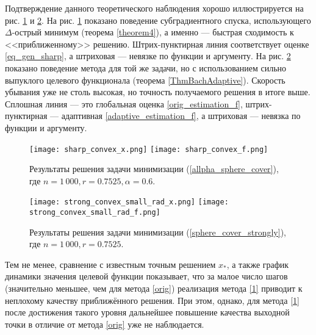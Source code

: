     Подтверждение данного теоретического наблюдения хорошо иллюстрируется на рис. \ref{res_sharp_convex} и \ref{res_strong_convex}. На рис. \ref{res_sharp_convex} показано поведение субградиентного спуска, использующего $\Delta$-острый минимум (теорема \ref{theorem4}), а именно --- быстрая сходимость к <<приближенному>> решению. Штрих-пунктирная линия соответствует оценке \eqref{eq_gen_sharp}, а штриховая --- невязке по функции и аргументу. На рис. \ref{res_strong_convex} показано поведение метода для той же задачи, но с использованием сильно выпуклого целевого функционала (теорема \ref{ThmBachAdaptive}). Скорость убывания уже не столь высокая, но точность получаемого решения в итоге выше. Сплошная линия --- это глобальная оценка \eqref{orig_estimation_f}, штрих-пунктирная --- адаптивная \eqref{adaptive_estimation_f}, а штриховая --- невязка по функции и аргументу.

    \begin{figure}[h]
        \texttt{[image: sharp\_convex\_x.png]}
        \endminipage\hfill
        \texttt{[image: sharp\_convex\_f.png]}
        \endminipage\hfill
        \caption{ Результаты решения задачи минимизации (\ref{allpha_sphere_cover}), где  $n= 1\,000, r = 0.7525, \alpha = 0.6$.}
        \label{res_sharp_convex}
    \end{figure}

    \begin{figure}[h]
        \texttt{[image: strong\_convex\_small\_rad\_x.png]}
        \endminipage\hfill
        \texttt{[image: strong\_convex\_small\_rad\_f.png]}
        \endminipage\hfill
        \caption{ Результаты решения задачи минимизации (\ref{sphere_cover_strongly}), где  $n= 1\,000, r = 0.7525$.}
        \label{res_strong_convex}
    \end{figure}

    Тем не менее, сравнение с известным точным решением $x_*$, а также график динамики значения целевой функции показывает, что за малое число шагов (значительно меньшее, чем для метода \eqref{orig}) реализация метода \eqref{1} приводит к неплохому качеству приближённого решения. При этом, однако, для метода \eqref{1} после достижения такого уровня дальнейшее повышение качества выходной точки в отличие от метода \eqref{orig} уже не наблюдается.

\FloatBarrier